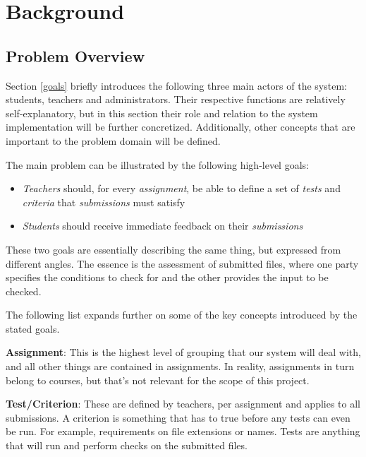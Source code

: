 \chapter{Background}

\section{Problem Overview}
\label{problem} %
Section \ref{goals} briefly introduces the following three main actors of the system: students, teachers and administrators. Their respective functions are relatively self-explanatory, but in this section their role and relation to the system implementation will be further concretized. Additionally, other concepts that are important to the problem domain will be defined.

The main problem can be illustrated by the following high-level goals:

\begin{itemize}
    \item \emph{Teachers} should, for every \emph{assignment}, be able to define a set of \emph{tests} and \emph{criteria} that \emph{submissions} must satisfy
    \item \emph{Students} should receive immediate feedback on their \emph{submissions}
\end{itemize}

These two goals are essentially describing the same thing, but expressed from different angles. The essence is the assessment of submitted files, where one party specifies the conditions to check for and the other provides the input to be checked.

The following list expands further on some of the key concepts introduced by the stated goals.

\textbf{Assignment}: This is the highest level of grouping that our system will deal with, and all other things are contained in assignments. In reality, assignments in turn belong to courses, but that's not relevant for the scope of this project.

\textbf{Test/Criterion}: These are defined by teachers, per assignment and applies to all submissions. A criterion is something that has to true before any tests can even be run. For example, requirements on file extensions or names. Tests are anything that will run and perform checks on the submitted files.

